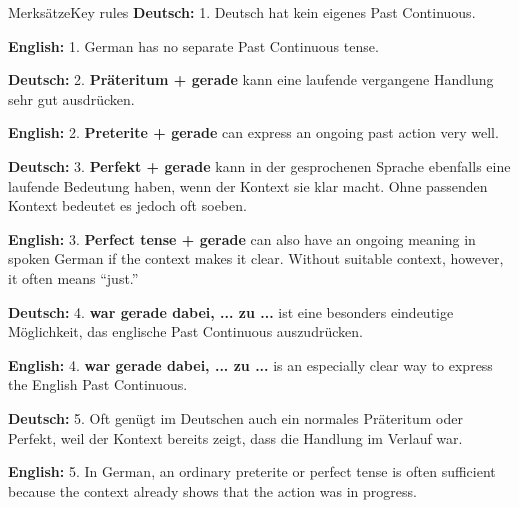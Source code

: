 \documentclass[a4paper,11pt]{article}
\newcommand{\GermanText}[1]{\textbf{Deutsch: }#1\par}
\newcommand{\EnglishText}[1]{{\small\color{SoftGray}\textbf{English: }#1\par}}
\begin{document}
        \begin{grammarentry}{Merksätze}{Key rules}
            \GermanText{1. Deutsch hat kein eigenes Past Continuous.}
            \EnglishText{1. German has no separate Past Continuous tense.}

            \GermanText{2. \textbf{Präteritum + gerade} kann eine laufende vergangene Handlung sehr gut ausdrücken.}
            \EnglishText{2. \textbf{Preterite + gerade} can express an ongoing past action very well.}

            \GermanText{3. \textbf{Perfekt + gerade} kann in der gesprochenen Sprache ebenfalls eine laufende Bedeutung haben, wenn der Kontext sie klar macht. Ohne passenden Kontext bedeutet es jedoch oft \glqq soeben\grqq.}
            \EnglishText{3. \textbf{Perfect tense + gerade} can also have an ongoing meaning in spoken German if the context makes it clear. Without suitable context, however, it often means ``just.''}

            \GermanText{4. \textbf{war gerade dabei, ... zu ...} ist eine besonders eindeutige Möglichkeit, das englische Past Continuous auszudrücken.}
            \EnglishText{4. \textbf{war gerade dabei, ... zu ...} is an especially clear way to express the English Past Continuous.}

            \GermanText{5. Oft genügt im Deutschen auch ein normales Präteritum oder Perfekt, weil der Kontext bereits zeigt, dass die Handlung im Verlauf war.}
            \EnglishText{5. In German, an ordinary preterite or perfect tense is often sufficient because the context already shows that the action was in progress.}
        \end{grammarentry}
\end{document}
